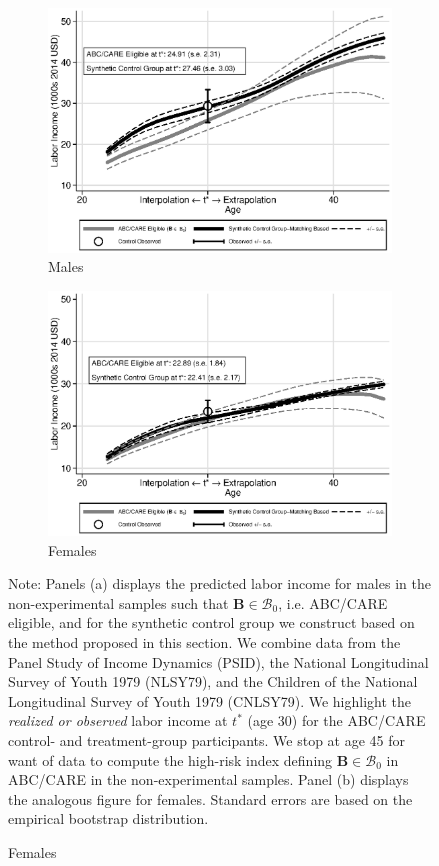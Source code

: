 \begin{figure}
\centering
\caption{Labor Income Profile, Disadvantaged Individuals Synthetic Control Group in the Non-experimental Samples}\label{figure:controltests}
\begin{subfigure}[h]{0.5\textwidth}
		\centering
		\caption{Males}
		\includegraphics[width=\textwidth]{output/abccare_disad_1.eps}
\end{subfigure}%
\begin{subfigure}[h]{0.5\textwidth}
		\centering
		\caption{Females}
		\includegraphics[width=\textwidth]{output/abccare_disad_0.eps}
\end{subfigure}
\footnotesize \justify
Note: Panels (a) displays the predicted labor income for males in the non-experimental samples such that $\bm{B} \in \mathcal{B}_0$, i.e. ABC/CARE eligible, and for the synthetic control group we construct based on the method proposed in this section. We combine data from the Panel Study of Income Dynamics (PSID), the National Longitudinal Survey of Youth 1979 (NLSY79), and the Children of the National Longitudinal Survey of Youth 1979 (CNLSY79). We highlight the \textit{realized or observed} labor income at $t^*$ (age 30) for the ABC/CARE control- and treatment-group participants. We stop at age 45 for want of data to compute the high-risk index defining $\bm{B} \in \mathcal{B}_0$ in ABC/CARE in the non-experimental samples. Panel (b) displays the analogous figure for females. Standard errors are based on the empirical bootstrap distribution.

\end{figure}
